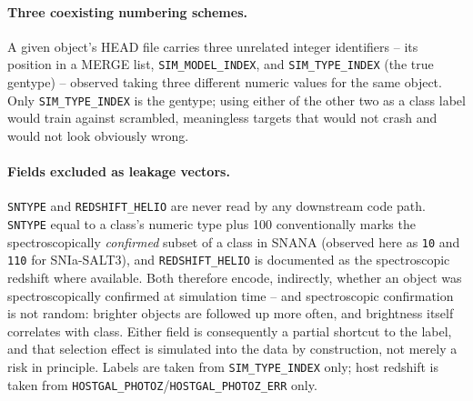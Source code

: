 \paragraph{Three coexisting numbering schemes.} A given object's HEAD file
carries three unrelated integer identifiers -- its position in a MERGE
list, \texttt{SIM\_MODEL\_INDEX}, and \texttt{SIM\_TYPE\_INDEX} (the true
gentype) -- observed taking three different numeric values for the same
object. Only \texttt{SIM\_TYPE\_INDEX} is the gentype; using either of the
other two as a class label would train against scrambled, meaningless
targets that would not crash and would not look obviously wrong.

\paragraph{Fields excluded as leakage vectors.} \texttt{SNTYPE} and
\texttt{REDSHIFT\_HELIO} are never read by any downstream code path.
\texttt{SNTYPE} equal to a class's numeric type plus 100 conventionally
marks the spectroscopically \emph{confirmed} subset of a class in SNANA
(observed here as \texttt{10} and \texttt{110} for SNIa-SALT3), and
\texttt{REDSHIFT\_HELIO} is documented as the spectroscopic redshift where
available. Both therefore encode, indirectly, whether an object was
spectroscopically confirmed at simulation time -- and spectroscopic
confirmation is not random: brighter objects are followed up more often,
and brightness itself correlates with class. Either field is consequently
a partial shortcut to the label, and that selection effect is simulated
into the data by construction, not merely a risk in principle. Labels are
taken from \texttt{SIM\_TYPE\_INDEX} only; host redshift is taken from
\texttt{HOSTGAL\_PHOTOZ}/\texttt{HOSTGAL\_PHOTOZ\_ERR} only.
